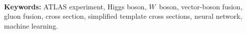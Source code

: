 


\leavevmode\\[5pt]
\noindent\textbf{Keywords:} ATLAS experiment, Higgs boson, $W$~boson, vector-boson fusion, gluon fusion, cross section, simplified template cross sections, neural network, machine learning.

